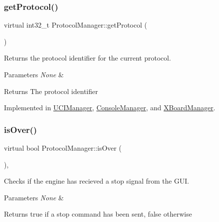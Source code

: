 \subsubsection{\texorpdfstring{get\+Protocol()}{getProtocol()}}
{\footnotesize\ttfamily virtual int32\+\_\+t Protocol\+Manager\+::get\+Protocol (\begin{DoxyParamCaption}{ }\end{DoxyParamCaption})\hspace{0.3cm}{\ttfamily [pure virtual]}}



Returns the protocol identifier for the current protocol. 


\begin{DoxyParams}{Parameters}
{\em None} & \\
\hline
\end{DoxyParams}
\begin{DoxyReturn}{Returns}
The protocol identifier 
\end{DoxyReturn}


Implemented in \mbox{\hyperlink{classUCIManager_af85c53751a85a5cb624e10fb1f9962c7}{U\+C\+I\+Manager}}, \mbox{\hyperlink{classConsoleManager_a12c11521d46af302d6c7d79d3b8174b4}{Console\+Manager}}, and \mbox{\hyperlink{classXBoardManager_a388ebffa15fa11ee763f4144f01fbcaf}{X\+Board\+Manager}}.

\mbox{\label{classProtocolManager_a1cab1bcb93ca3542821965e62ee59c33}} 
\subsubsection{\texorpdfstring{is\+Over()}{isOver()}}
{\footnotesize\ttfamily virtual bool Protocol\+Manager\+::is\+Over (\begin{DoxyParamCaption}{ }\end{DoxyParamCaption})\hspace{0.3cm}{\ttfamily [inline]}, {\ttfamily [virtual]}}



Checks if the engine has recieved a stop signal from the G\+UI. 


\begin{DoxyParams}{Parameters}
{\em None} & \\
\hline
\end{DoxyParams}
\begin{DoxyReturn}{Returns}
true if a stop command has been sent, false otherwise 
\end{DoxyReturn}


